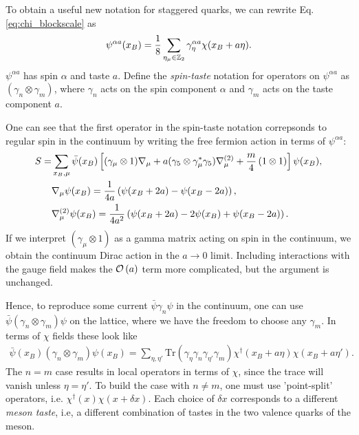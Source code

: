     To obtain a useful new notation for staggered quarks, we can rewrite Eq. \eqref{eq:chi_blockscale} as
    \begin{align}
      \psi^{\alpha a}(x_B) = {1\over 8} \sum_{\eta_{\mu}\in\mathbb{Z}_2} \gamma_{\eta}^{\alpha a} \chi(x_B+a\eta).
    \end{align}
$\psi^{\alpha a}$ has spin $\alpha$ and taste $a$. Define the {\it{spin-taste}} notation for operators on $\psi^{\alpha a}$ as $(\gamma_n\otimes \gamma_m)$, where $\gamma_n$ acts on the spin component $\alpha$ and $\gamma_m$ acts on the taste component $a$. 

    One can see that the first operator in the spin-taste notation correpsonds to regular spin in the continuum by writing the free fermion action in terms of $\psi^{\alpha a}$:
    \begin{align}
      \nonumber
      S =& \sum_{x_B,\mu} \bar{\psi}(x_B) \left[ (\gamma_{\mu}\otimes 1) \nabla_{\mu} + a ( \gamma_5 \otimes \gamma^*_{\mu} \gamma_5 ) \nabla^{(2)}_{\mu} + {m\over 4}\, (1\otimes 1)  \right] \psi(x_B), \\
      \nonumber
      &\nabla_{\mu}\psi(x_B) = {1\over 4a}\left( \psi(x_B+2a) - \psi(x_B-2a) \right), \\
      &\nabla^{(2)}_{\mu}\psi(x_B) = {1\over 4a^2}\left( \psi(x_B+2a) - 2\psi(x_B) + \psi(x_B-2a) \right).
    \end{align}
If we interpret $(\gamma_{\mu}\otimes 1)$ as a gamma matrix acting on spin in the continuum, we obtain the continuum Dirac action in the $a\to 0$ limit. Including interactions with the gauge field makes the $\mathcal{O}\left( a \right)$ term more complicated, but the argument is unchanged.

    Hence, to reproduce some current $\bar{\psi}\gamma_n\psi$ in the continuum, one can use $\bar{\psi}(\gamma_n\otimes \gamma_m)\psi$ on the lattice, where we have the freedom to choose any $\gamma_m$. In terms of $\chi$ fields these look like
    \begin{align}
      \bar{\psi}(x_B)(\gamma_n\otimes \gamma_m) \psi(x_B) = \sum_{\eta,\eta'} \text{Tr} (\gamma_{\eta} \gamma_n \gamma_{\eta'} \gamma_m) \chi^{\dagger}(x_B+a\eta) \chi(x_B+a\eta').
    \end{align}
    The $n=m$ case results in local operators in terms of $\chi$, since the trace will vanish unless $\eta=\eta'$. To build the case with $n\neq m$, one must use 'point-split' operators, i.e. $\chi^{\dagger} (x) \chi(x+\delta x)$. Each choice of $\delta x$ corresponds to a different {\it{meson taste}}, i.e, a different combination of tastes in the two valence quarks of the meson.

